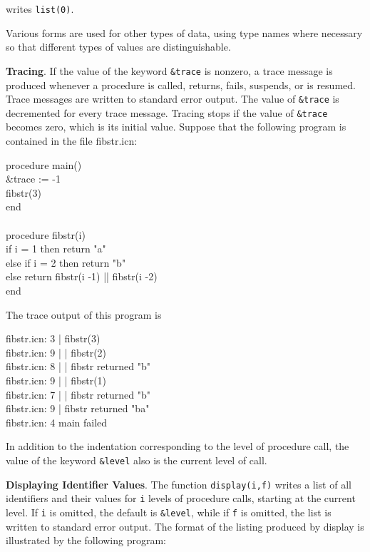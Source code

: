 
\noindent writes \texttt{list(0)}.

Various forms are used for other types of data, using type names where
necessary so that different types of values are distinguishable.


\textbf{Tracing}. If the value of the keyword \texttt{\&trace} is
nonzero, a trace message is produced whenever a procedure is called,
returns, fails, suspends, or is resumed. Trace messages are written to
standard error output. The value of \texttt{\&trace} is decremented
for every trace message. Tracing stops if the value of
\texttt{\&trace} becomes zero, which is its initial value. Suppose
that the following program is contained in the file fibstr.icn:

\begin{iconcode}
\>procedure main()\\
\>\>\&trace := -1\\
\>\>fibstr(3)\\
\>end\\
\\
\>procedure fibstr(i)\\
\>\>if i = 1 then return "a"\\
\>\>else if i = 2 then return "b"\\
\>\>else return fibstr(i -1) || fibstr(i -2)\\
\>end
\end{iconcode}

The trace output of this program is

\begin{iconcode}
\>fibstr.icn: 3  \>\>\>\>\>\>  | fibstr(3)\\
\>fibstr.icn: 9  \>\>\>\>\>\>  | | fibstr(2)\\
\>fibstr.icn: 8  \>\>\>\>\>\>  | | fibstr returned "b"\\
\>fibstr.icn: 9  \>\>\>\>\>\>  | | fibstr(1)\\
\>fibstr.icn: 7  \>\>\>\>\>\>  | | fibstr returned "b"\\
\>fibstr.icn: 9  \>\>\>\>\>\>  | fibstr returned "ba"\\
\>fibstr.icn: 4  \>\>\>\>\>\>  main failed
\end{iconcode}

In addition to the indentation corresponding to the level of procedure
call, the value of the keyword \texttt{\&level} also is the current
level of call.

\textbf{Displaying Identifier Values}. The function
\texttt{display(i,f)} writes a list of all identifiers and their
values for \texttt{i} levels of procedure calls, starting at the
current level. If \texttt{i} is omitted, the default is
\texttt{\&level}, while if \texttt{f} is omitted, the list is written
to standard error output. The format of the listing produced by
display is illustrated by the following program:


